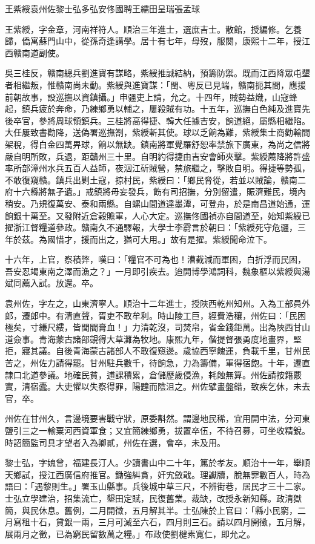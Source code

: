 
\begin{pinyinscope}
王紫綬袁州佐黎士弘多弘安佟國聘王繻田呈瑞張孟球

王紫綬，字金章，河南祥符人。順治三年進士，選庶吉士。散館，授編修。乞養歸，僑寓蘇門山中，從孫奇逢講學。居十有七年，母歿，服闋，康熙十二年，授江西贛南道副使。

吳三桂反，贛南總兵劉進寶有謀略，紫綬推誠結納，預籌防禦。既而江西降眾屯墾者相繼叛，惟贛南尚未動。紫綬與進寶謀：「閩、粵反已見端，贛南扼其間，應援前朝故事，設巡撫以資鎮攝。」申疆吏上請，允之。十四年，賊勢益熾，山寇蜂起，鎮兵疲於奔命，乃練鄉勇以輔之，屢殺賊有功。十五年，巡撫白色純及進寶先後卒官，參將周球領鎮兵。三桂將高得捷、韓大任據吉安，餉道絕，屬縣相繼陷。大任屢致書勸降，送偽署巡撫劄，紫綬斬其使。球以乏餉為難，紫綬集士商勸輸間架稅，得白金四萬畀球，餉以無缺。鎮南將軍覺羅舒恕率禁旅下廣東，為尚之信將嚴自明所敗，兵退，距贛州三十里。自明約得捷由吉安會師夾擊。紫綬薦降將許盛率所部漳州水兵五百人益師，夜泅江斫賊營，禁旅繼之，擊敗自明。得捷等勢孤，不敢復窺贛。鎮兵出剿土寇，掠村民，紫綬曰：「鄉民脅從，若並以賊論，贛南二府十六縣將無孑遺。」戒鎮將毋妄發兵，飭有司招撫，分別留遣，賑濟難民，境內稍安。乃規復萬安、泰和兩縣。自螺山間道達墨潭，可登舟，於是南昌道始通，運餉銀十萬至。又發附近倉穀贍軍，人心大定。巡撫佟國禎亦自間道至，始知紫綬已擢浙江督糧道參政。贛南久不通驛報，大學士李霨言於朝曰：「紫綬死守危疆，三年於茲。為國惜才，援而出之，猶可大用。」故有是擢。紫綬聞命泣下。

十六年，上官，察積弊，嘆曰：「糧官不可為也！漕截減而軍困，白折浮而民困，吾安忍竭東南之澤而漁之？」一月即引疾去。迨開博學鴻詞科，魏象樞以紫綬與湯斌同薦入試。放還。卒。

袁州佐，字左之，山東濟寧人。順治十二年進士，授陜西乾州知州。入為工部員外郎，遷郎中。有清直聲，胥吏不敢牟利。時山陵工巨，經費浩穰，州佐曰：「民困極矣，寸縑尺縷，皆閭閻膏血！」力清乾沒，司焚帛，省金錢鉅萬。出為陜西甘山道僉事。青海蒙古諸部覬得大草灘為牧地。康熙九年，偕提督張勇度地畫界，堅拒，寢其議。自後青海蒙古諸部人不敢復窺邊。歲協西寧餽運，負載千里，甘州民苦之，州佐力請得罷。甘州駐兵數千，待餉急，力為籌備，軍得宿飽。十年，遷直隸口北道參議。地確民貧，逋課積累，倉儲歷歲侵漁，耗蝕無算。州佐請按籍覈實，清宿蠹。大吏懼以失察得罪，陽韙而陰沮之。州佐擘畫盤錯，致疾乞休，未去官，卒。

州佐在甘州久，言邊境要害戰守狀，原委斠然。謂邊地民稀，宜用開中法，分河東鹽引三之一輸粟河西資軍食；又宜簡練鄉勇，拔置卒伍，不待召募，可坐收精銳。時詔簡監司具才望者入為卿貳，州佐在選，會卒，未及用。

黎士弘，字媿曾，福建長汀人。少讀書山中二十年，篤於孝友。順治十一年，舉順天鄉試，授江西廣信府推官。鋤強糾貪，奸宄斂戢。理讞牘，脫無罪數百人，時為語曰：「遇黎則生。」署玉山縣事。兵後城中草三尺，不辨街巷，居民才三十二家。士弘立學建治，招集流亡，墾田定賦，民復舊業。裁缺，改授永新知縣。政清獄簡，與民休息。舊例，二月開徵，五月解其半。士弘陳於上官曰：「縣小民窮，二月寫租十石，貸銀一兩，三月可減至六石，四月則三石。請以四月開徵，五月解，展兩月之徵，已為窮民留數萬之糧。」布政使劉楗素寬仁，即允之。


\end{pinyinscope}
